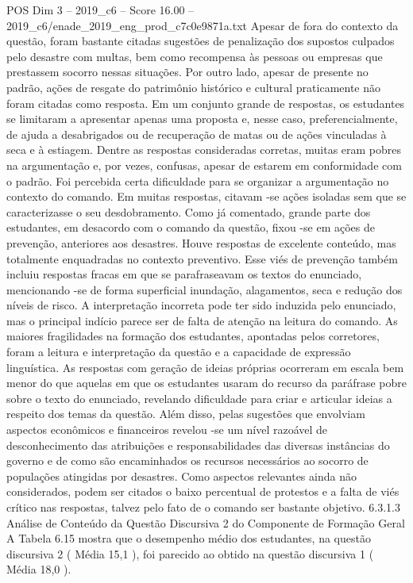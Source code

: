 \begin{textsample}{POS Dim 3 – 2019\_c6 – Score 16.00 – 2019\_c6/enade\_2019\_eng\_prod\_c7c0e9871a.txt}
Apesar de fora do contexto da questão, foram bastante citadas sugestões de penalização dos supostos culpados pelo desastre com multas, bem como recompensa às pessoas ou empresas que prestassem socorro nessas situações.
Por outro lado, apesar de presente no padrão, ações de resgate do patrimônio histórico e cultural praticamente não foram citadas como resposta.
Em um conjunto grande de respostas, os estudantes se limitaram a apresentar apenas uma proposta e, nesse caso, preferencialmente, de ajuda a desabrigados ou de recuperação de matas ou de ações vinculadas à seca e à estiagem.
Dentre as respostas consideradas corretas, muitas eram pobres na argumentação e, por vezes, confusas, apesar de estarem em conformidade com o padrão.
Foi percebida certa dificuldade para se organizar a argumentação no contexto do comando.
Em muitas respostas, citavam -se ações isoladas sem que se caracterizasse o seu desdobramento.
Como já comentado, grande parte dos estudantes, em desacordo com o comando da questão, fixou -se em ações de prevenção, anteriores aos desastres.
Houve respostas de excelente conteúdo, mas totalmente enquadradas no contexto preventivo.
Esse viés de prevenção também incluiu respostas fracas em que se parafraseavam os textos do enunciado, mencionando -se de forma superficial inundação, alagamentos, seca e redução dos níveis de risco.
A interpretação incorreta pode ter sido induzida pelo enunciado, mas o principal indício parece ser de falta de atenção na leitura do comando.
As maiores fragilidades na formação dos estudantes, apontadas pelos corretores, foram a leitura e interpretação da questão e a capacidade de expressão linguística.
As respostas com geração de ideias próprias ocorreram em escala bem menor do que aquelas em que os estudantes usaram do recurso da paráfrase pobre sobre o texto do enunciado, revelando dificuldade para criar e articular ideias a respeito dos temas da questão.
Além disso, pelas sugestões que envolviam aspectos econômicos e financeiros revelou -se um nível razoável de desconhecimento das atribuições e responsabilidades das diversas instâncias do governo e de como são encaminhados os recursos necessários ao socorro de populações atingidas por desastres.
Como aspectos relevantes ainda não considerados, podem ser citados o baixo percentual de protestos e a falta de viés crítico nas respostas, talvez pelo fato de o comando ser bastante objetivo. 6.3.1.3 Análise de Conteúdo da Questão Discursiva 2 do Componente de Formação Geral A Tabela 6.15 mostra que o desempenho médio dos estudantes, na questão discursiva 2 ( Média 15,1 ), foi parecido ao obtido na questão discursiva 1 ( Média 18,0 ).

\end{textsample}
